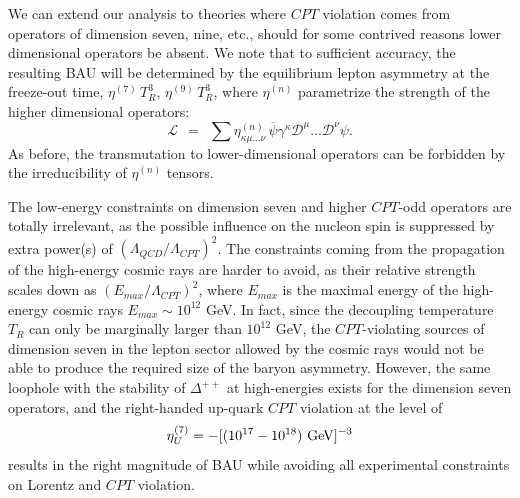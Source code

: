 \documentclass[12pt]{revtex4}
\newcommand{\eq}{{\rm eq}}
\newcommand{\mc}[1]{\mathcal{#1}}
\newcommand{\md}{\mathcal{D}}
\newcommand{\ov}{\overline}
\begin{document}
We can extend our analysis to theories where $CPT$ violation comes from operators of dimension 
seven, nine, etc., should for some contrived reasons lower dimensional operators be absent. 
	We note that to sufficient accuracy, the resulting BAU
	will be determined by the equilibrium lepton asymmetry
	at the freeze-out time, $ \eta^{(7)}\,T_R^3 $, $ \eta^{(9)}\,T_R^3 $, 
	where $\eta^{(n)}$ parametrize the strength of the higher dimensional operators:
\[
	\mc{L} ~~=~~ \sum \eta^{(n)}_{\kappa\mu...\nu}\,
	\ov{\psi} \gamma^\kappa \md^\mu ...\md^\nu  \psi.
\]
As before, the transmutation to lower-dimensional operators can be forbidden 
by the irreducibility of $\eta^{(n)}$ tensors. 

The low-energy constraints on dimension seven and higher $CPT$-odd operators 
are totally irrelevant, as the possible influence on the nucleon spin is 
suppressed by extra power(s) of $(\Lambda_{QCD}/\Lambda_{CPT})^2$.  The constraints 
coming from the propagation of the high-energy cosmic rays are harder to avoid, as their 
relative strength scales down as $(E_{max}/\Lambda_{CPT})^2$, where $E_{max}$ is the maximal 
energy of the high-energy cosmic rays $E_{max}\sim 10^{12}$ GeV. In fact, since the decoupling
temperature $T_R$ can only be  marginally larger than $10^{12}$ GeV, the $CPT$-violating 
sources of dimension seven in the lepton sector allowed by the cosmic rays would not 
be able to produce the required size of the baryon asymmetry. However, the same loophole 
with the stability of $\Delta^{++}$ at high-energies 
exists for the dimension seven operators, and the right-handed up-quark $CPT$ violation
at the level of 
\begin{equation}
\eta^{(7)}_U = - [(10^{17}-10^{18})~ {\rm GeV}]^{-3}
\end{equation}
results in the right magnitude of BAU while avoiding all 
experimental constraints on Lorentz and $CPT$ violation.  
\end{document}
